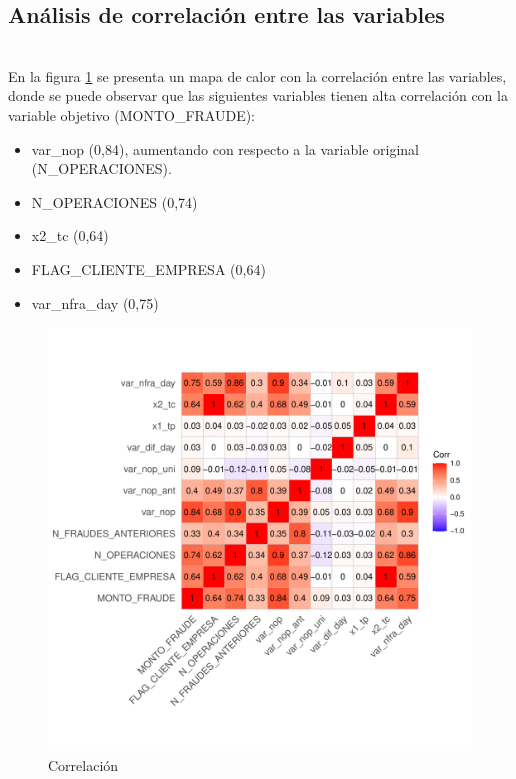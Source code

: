 \documentclass[
	11pt, %
	spanish, %
]{fphw}
\begin{document}
\newpage
\subsection*{Análisis de correlación entre las variables} \hfill \\
En la figura \ref{Correlacion} se presenta un mapa de calor con la correlación entre las variables, donde se puede observar que las siguientes variables tienen alta correlación con la variable objetivo (MONTO\_FRAUDE):
\begin{itemize}
\item var\_nop (0,84), aumentando con respecto a la variable original (N\_OPERACIONES).
\item N\_OPERACIONES (0,74)
\item x2\_tc (0,64)
\item FLAG\_CLIENTE\_EMPRESA (0,64)
\item var\_nfra\_day (0,75)
\end{itemize}


\begin{figure}[h!]
\begin{center}
\includegraphics[width=6in]{corr4.pdf}
\caption{Correlación}
\label{Correlacion}
\end{center}
\end{figure}
\end{document}
